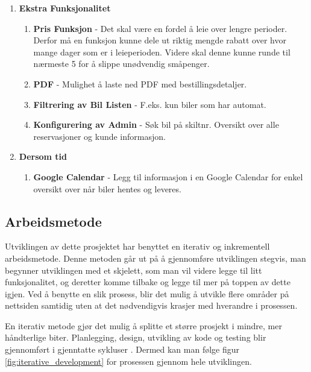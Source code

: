 \begin{enumerate}
  \item \textbf{Ekstra Funksjonalitet}
	\begin{enumerate}
		\item \textbf{Pris Funksjon} - Det skal være en fordel å leie over lengre perioder. Derfor må en funksjon kunne dele ut riktig mengde rabatt over hvor mange dager som er i leieperioden. Videre skal denne kunne runde til nærmeste 5 for å slippe unødvendig småpenger.
		\item \textbf{PDF} - Mulighet å laste ned PDF med bestillingsdetaljer.
		\item \textbf{Filtrering av Bil Listen} - F.eks. kun biler som har automat. 
		\item \textbf{Konfigurering av Admin} - Søk bil på skiltnr. Oversikt over alle reservasjoner og kunde informasjon.
	\end{enumerate}
  \item \textbf{Dersom tid}
  	\begin{enumerate}
  	\item \textbf{Google Calendar} - Legg til informasjon i en Google Calendar for enkel oversikt over når biler hentes og leveres.
  	\end{enumerate}
 
 \end{enumerate}
 
 
\subsection{Arbeidsmetode} \label{chap:method}
Utviklingen av dette prosjektet har benyttet en iterativ og inkrementell arbeidsmetode. Denne metoden går ut på å gjennomføre utviklingen stegvis, man begynner utviklingen med et skjelett, som man vil videre legge til litt funksjonalitet, og deretter komme tilbake og legge til mer på toppen av dette igjen. Ved å benytte en slik prosess, blir det mulig å utvikle flere områder på nettsiden samtidig uten at det nødvendigvis krasjer med hverandre i prosessen.

En iterativ metode gjør det mulig å splitte et større prosjekt i mindre, mer håndterlige biter. Planlegging, design, utvikling av kode og testing blir gjennomført i gjenntatte sykluser \cite{method:iterative_fig}. Dermed kan man følge figur \ref{fig:iterative_development} for prosessen gjennom hele utviklingen.

